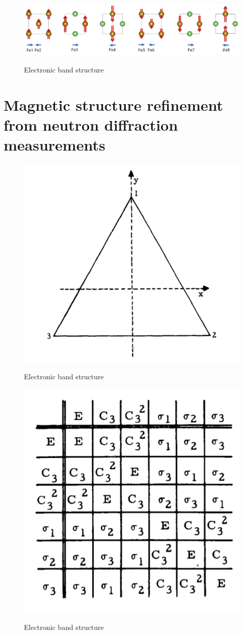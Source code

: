 \documentclass[11pt,edeposit,draftthesis]{uiucthesis2020}
\begin{document}
\begin{mainmatter}
\begin{figure}
\centering\includegraphics[width=\columnwidth]{figures/ch2/antidamping_torque_Fe2As.png} \\
\caption{\label{fig:antidamping_torque_Fe2As}
Electronic band structure
}
\end{figure}

\Blindtext[6]

\chapter{Magnetic structure refinement from neutron diffraction measurements}

\begin{figure}
\centering\includegraphics[width=0.5\columnwidth]{figures/ch3/C3v.png} \\
\caption{\label{fig:C3v}
Electronic band structure
}
\end{figure}

\begin{figure}
\centering\includegraphics[width=0.5\columnwidth]{figures/ch3/group_multiplication_table_C3v.png} \\
\caption{\label{fig:gmt_C3v}
Electronic band structure
}
\end{figure}


\end{mainmatter}
\end{document}

